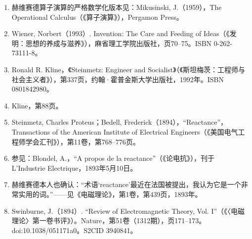 \begin{enumerate}
\item 赫维赛德算子演算的严格数学化版本见：Mikusinski, J.（1959），The Operational Calculus（《算子演算》），Pergamon Press。
\item Wiener, Norbert（1993）. Invention: The Care and Feeding of Ideas（《发明：思想的养成与滋养》），麻省理工学院出版社，页70–75。ISBN 0-262-73111-8。
\item Ronald R. Kline，《Steinmetz: Engineer and Socialist》（《斯坦梅茨：工程师与社会主义者》），第337页，约翰·霍普金斯大学出版社，1992年。ISBN 0801842980。
\item Kline，第88页。
\item Steinmetz, Charles Proteus；Bedell, Frederick（1894），“Reactance”，Transactions of the American Institute of Electrical Engineers（《美国电气工程师学会汇刊》），第11卷，第768–776页。
\item 参见：Blondel, A.，“A propos de la reactance”（《论电抗》），刊于 L’Industrie Electrique，1893年5月10日。
\item 赫维赛德本人也确认：“术语‘reactance’最近在法国被提出，我认为它是一个非常实用的词。”——见《电磁理论》，第1卷，第439页，1893年。
\item Swinburne, J.（1894）. “Review of Electromagnetic Theory, Vol. I”（《〈电磁理论〉第一卷书评》）。Nature，第51卷（1312期），页171–173。doi:10.1038/051171a0。S2CID 3940841。

\end{enumerate}